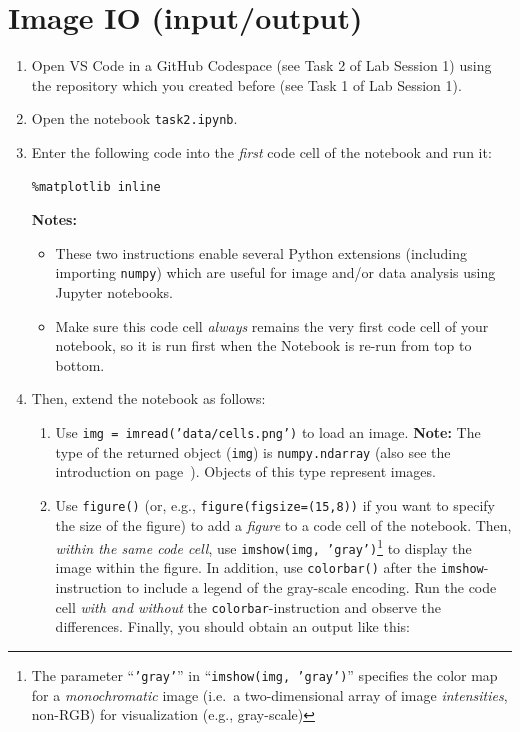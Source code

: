 \documentclass[12pt,a4paper]{article}
\begin{document}
\section{Image IO (input/output)}
\label{task:io}
\begin{enumerate}
    \item Open VS Code in a GitHub Codespace (see Task 2 of Lab Session 1) using the repository which you created before (see Task 1 of Lab Session 1).
    \item Open the notebook \texttt{task2.ipynb}.
    \item Enter the following code into the \emph{first} code cell of the notebook and run it:
\begin{Verbatim}[frame=single]
%pylab
%matplotlib inline
\end{Verbatim}
    \textbf{Notes:}
    \begin{itemize}
        \item These two instructions enable several Python extensions (including importing \texttt{numpy}) which are useful for image and/or data analysis using Jupyter notebooks.
        \item Make sure this code cell \emph{always} remains the very first code cell of your notebook, so it is run first when the Notebook is re-run from top to bottom.
    \end{itemize}
    \item Then, extend the notebook as follows:
    \begin{enumerate}
        \item Use \texttt{img = imread('data/cells.png')} to load an image. \textbf{Note:} The type of the returned object (\texttt{img}) is \texttt{numpy.ndarray} (also see the introduction on page~\pageref{sec:ndarray}). Objects of this type represent images.
        \item Use \texttt{figure()} (or, e.g., \texttt{figure(figsize=(15,8))} if you want to specify the size of the figure) to add a \emph{figure} to a code cell of the notebook. Then, \emph{within the same code cell}, use \texttt{imshow(img, 'gray')}\footnote{The parameter ``\texttt{'gray'}'' in ``\texttt{imshow(img, 'gray')}'' specifies the color map for a \emph{monochromatic} image (i.e.\ a two-dimensional array of image \emph{intensities}, non-RGB) for visualization (e.g., gray-scale)} to display the image within the figure. In addition, use \texttt{colorbar()} after the \texttt{imshow}-instruction to include a legend of the gray-scale encoding. Run the code cell \emph{with and without} the \texttt{colorbar}-instruction and observe the differences. Finally, you should obtain an output like this:

\end{enumerate}
\end{enumerate}
\end{document}
